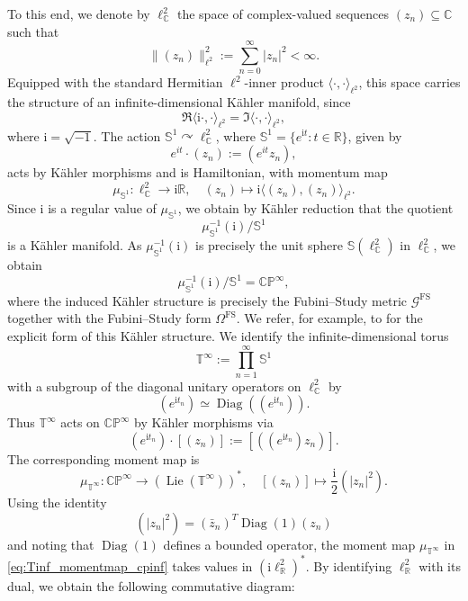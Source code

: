 \documentclass[12pt]{amsart}
\numberwithin{figure}{section}
\numberwithin{table}{section}
\numberwithin{equation}{section}
\def\S{\mathbb{S}}
\def\RR{\mathbb{R}}
\def\CC{\mathbb{C}}
\def\i{\mathrm{i}}
\begin{document}
To this end, we denote by \(\ell_{\mathbb{C}}^2\) the space of complex-valued sequences \((z_n)\subseteq \mathbb{C}\) such that
\[
\| (z_n)\|_{\ell^2}^2:=\sum_{n=0}^{\infty} |z_n|^2 < \infty.
\]
Equipped with the standard Hermitian \(\ell^2\)-inner product \(\langle \cdot, \cdot \rangle_{\ell^2}\), this space carries the structure of an infinite-dimensional Kähler manifold, since
\[
\Re \langle \mathrm{i}\cdot, \cdot \rangle_{\ell^2} = \Im \langle \cdot, \cdot \rangle_{\ell^2},
\]
where \(\mathrm{i}=\sqrt{-1}\). The action \(\mathbb{S}^1 \curvearrowright \ell_{\mathbb{C}}^2\), where \(\S^1=\{e^{\i t}: t\in \RR\}\), given by
\[
e^{it} \cdot (z_n) := (e^{it}z_n),
\]
acts by Kähler morphisms and is Hamiltonian, with momentum map
\begin{equation} \label{eq:S1_momentmap_cpinf}
	\mu_{\mathbb{S}^1} : \ell^2_{\mathbb{C}} \longrightarrow  \mathrm{i} \mathbb{R}, \quad (z_n) \mapsto \mathrm{i} \langle (z_n), (z_n) \rangle_{\ell^2}.
\end{equation}
Since \(\mathrm{i}\) is a regular value of \(\mu_{\mathbb{S}^1}\), we obtain by Kähler reduction that the quotient
\[
\mu_{\mathbb{S}^1}^{-1}(\mathrm{i}) / \mathbb{S}^1
\]
is a Kähler manifold. As \(\mu_{\mathbb{S}^1}^{-1}(\mathrm{i})\) is precisely the unit sphere \(\mathbb{S}(\ell_{\mathbb{C}}^2)\) in \(\ell_{\mathbb{C}}^2\), we obtain
\[
\mu_{\mathbb{S}^1}^{-1}(\mathrm{i}) / \mathbb{S}^1 = \mathbb{CP}^{\infty},
\]
where the induced Kähler structure is precisely the Fubini--Study metric \(\mathcal{G}^{\mathrm{FS}}\) together with the Fubini--Study form \(\Omega^{\mathrm{FS}}\). We refer, for example, to \cite[§2]{khesin_geometry_2019} for the explicit form of this Kähler structure. We identify the infinite-dimensional torus
\[
\mathbb{T}^{\infty} := \prod_{n=1}^{\infty} \mathbb{S}^1
\]
with a subgroup of the diagonal unitary operators on \(\ell^2_{\CC}\) by
\[
(e^{\mathrm{i} t_n})\simeq \operatorname{Diag}((e^{\mathrm{i} t_n})).
\]
Thus \(\mathbb{T}^{\infty}\) acts on \(\mathbb{CP}^\infty\) by Kähler morphisms via
\[
\left(e^{\mathrm{i} t_n}\right) \cdot [(z_n)] := [((e^{\mathrm{i} t_n})z_n)].
\]
The corresponding moment map is
\begin{equation}\label{eq:Tinf_momentmap_cpinf}
	\mu_{\mathbb{T}^{\infty}}: \mathbb{CP}^\infty \to (\operatorname{Lie}(\mathbb{T}^{\infty}))^*, \quad [(z_n)] \mapsto \frac{\mathrm{i}}{2} (|z_n|^2).
\end{equation}
Using the identity
\[
(|z_n|^2) = (\bar{z}_n)^T \operatorname{Diag}(1) (z_n)
\]
and noting that \(\operatorname{Diag}(1)\) defines a bounded operator, the moment map \(\mu_{\mathbb{T}^\infty}\) in \eqref{eq:Tinf_momentmap_cpinf} takes values in \((\mathrm{i} \ell^2_{\RR})^*\). By identifying \(\ell^2_{\RR}\) with its dual, we obtain the following commutative diagram:
\end{document}
